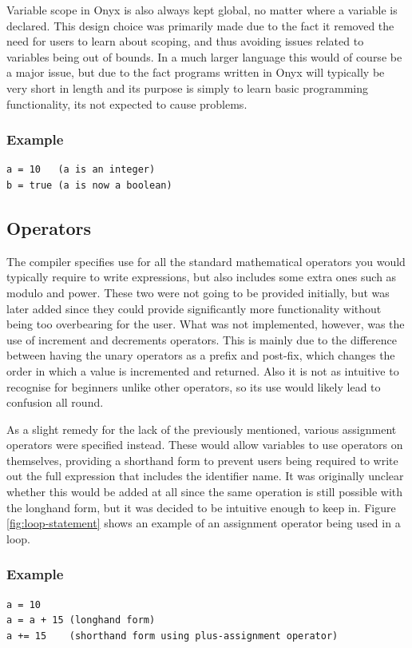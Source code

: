 \documentclass[
]{report}
\begin{document}
Variable scope in Onyx is also always kept global, no matter where a
variable is declared. This design choice was primarily made due to the
fact it removed the need for users to learn about scoping, and thus
avoiding issues related to variables being out of bounds. In a much
larger language this would of course be a major issue, but due to the
fact programs written in Onyx will typically be very short in length and
its purpose is simply to learn basic programming functionality, its not
expected to cause problems.

\subsubsection{Example}
\begin{verbatim}
a = 10   (a is an integer)
b = true (a is now a boolean)
\end{verbatim}

\subsection{Operators}
The compiler specifies use for all the standard mathematical operators
you would typically require to write \glspl{expression}, but also includes some
extra ones such as modulo and power. These two were not going to be
provided initially, but was later added since they could provide
significantly more functionality without being too overbearing for the
user. What was not implemented, however, was the use of increment and
decrements operators. This is mainly due to the difference between
having the unary operators as a prefix and post-fix, which changes the
order in which a value is incremented and returned. Also it is not as
intuitive to recognise for beginners unlike other operators, so its use
would likely lead to confusion all round.

As a slight remedy for the lack of the previously mentioned, various
assignment operators were specified instead. These would allow variables
to use operators on themselves, providing a shorthand form to prevent
users being required to write out the full \gls{expression} that includes the
\gls{identifier} name. It was originally unclear whether this would be added
at all since the same operation is still possible with the longhand
form, but it was decided to be intuitive enough to keep in. Figure \ref{fig:loop-statement}
shows an example of an assignment operator being used in a loop.

\subsubsection{Example}
\begin{verbatim}
a = 10
a = a + 15 (longhand form)
a += 15    (shorthand form using plus-assignment operator)
\end{verbatim}
\end{document}
